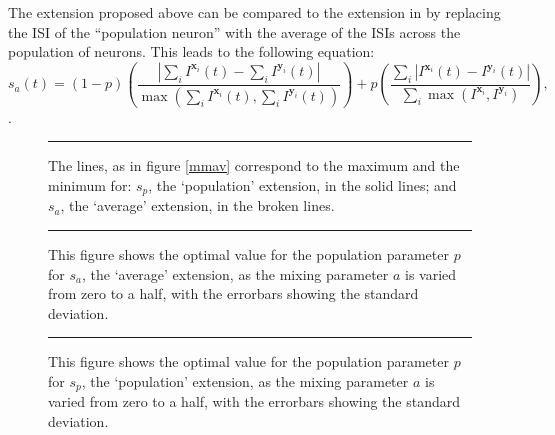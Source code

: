 The extension proposed above can be compared to the extension in \citep{KreuzEtAl2009a} by replacing the ISI of the ``population neuron'' with the average of the ISIs across the population of neurons.  This leads to the following equation: 
\begin{equation}
\label{av}
s_a(t) = (1-p) \left(\frac{ | \sum_i I^{\mathbf{x}_i}(t) - \sum_i I^{\mathbf{y}_i}(t) |}{\max (\sum_i I^{\mathbf{x}_i}(t),\sum_i I^{\mathbf{y}_i}(t) )}\right) + p\left( \frac{\sum_i | I^{\mathbf{x}_i}(t) - I^{\mathbf{y}_i}(t) |}{\sum_i \max (I^{\mathbf{x}_i},I^{\mathbf{y}_i})} \right),
\end{equation}.


\begin{figure}[htb]

\bigskip
\rule{33em}{0.5pt}
\caption{The lines, as in figure \ref{mmav} correspond to the maximum and the minimum for: $s_p$, the \lq{}population\rq{} extension, in the solid lines; and $s_a$, the \lq{}average\rq{} extension, in the broken lines.}
\end{figure}

\begin{figure}[htb]

\bigskip
\rule{33em}{0.5pt}
\caption{This figure shows the optimal value for the population parameter $p$ for $s_a$, the \lq{}average\rq{} extension, as the mixing parameter $a$ is varied from zero to a half, with the errorbars showing the standard deviation.}
\end{figure}

\begin{figure}[htb]

\bigskip
\rule{33em}{0.5pt}
\caption{This figure shows the optimal value for the population parameter $p$ for $s_p$, the \lq{}population\rq{} extension, as the mixing parameter $a$ is varied from zero to a half, with the errorbars showing the standard deviation.}
\end{figure}
%

